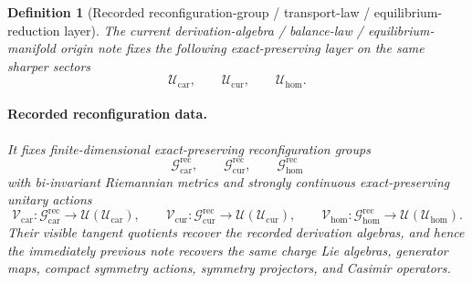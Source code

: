 \documentclass[11pt]{article}
\newcommand{\RootTensorClass}{\mathscr U_{\mathrm{car}}}
\newcommand{\RootRelabelClass}{\mathscr U_{\mathrm{cur}}}
\newcommand{\RootFreeClass}{\mathscr U_{\mathrm{hom}}}
\newcommand{\TensorReconGroup}{\mathcal G_{\mathrm{car}}^{\mathrm{rec}}}
\newcommand{\CurReconGroup}{\mathcal G_{\mathrm{cur}}^{\mathrm{rec}}}
\newcommand{\HomReconGroup}{\mathcal G_{\mathrm{hom}}^{\mathrm{rec}}}
\newcommand{\TensorReconAct}{\mathscr V_{\mathrm{car}}}
\newcommand{\CurReconAct}{\mathscr V_{\mathrm{cur}}}
\newcommand{\HomReconAct}{\mathscr V_{\mathrm{hom}}}
\newtheorem{definition}{Definition}
\begin{document}
\begin{definition}[Recorded reconfiguration-group / transport-law / equilibrium-reduction layer]
\label{def:recorded_layer}
The current derivation-algebra / balance-law / equilibrium-manifold origin note fixes the following exact-preserving layer on the same sharper sectors
\[
\RootTensorClass,\qquad
\RootRelabelClass,\qquad
\RootFreeClass.
\]

\paragraph{Recorded reconfiguration data.}
It fixes finite-dimensional exact-preserving reconfiguration groups
\[
\TensorReconGroup,\qquad
\CurReconGroup,\qquad
\HomReconGroup
\]
with bi-invariant Riemannian metrics and strongly continuous exact-preserving unitary actions
\[
\TensorReconAct:\TensorReconGroup\to\mathcal U(\RootTensorClass),\qquad
\CurReconAct:\CurReconGroup\to\mathcal U(\RootRelabelClass),\qquad
\HomReconAct:\HomReconGroup\to\mathcal U(\RootFreeClass).
\]
Their visible tangent quotients recover the recorded derivation algebras, and hence the immediately previous note recovers the same charge Lie algebras, generator maps, compact symmetry actions, symmetry projectors, and Casimir operators.


\end{definition}
\end{document}
